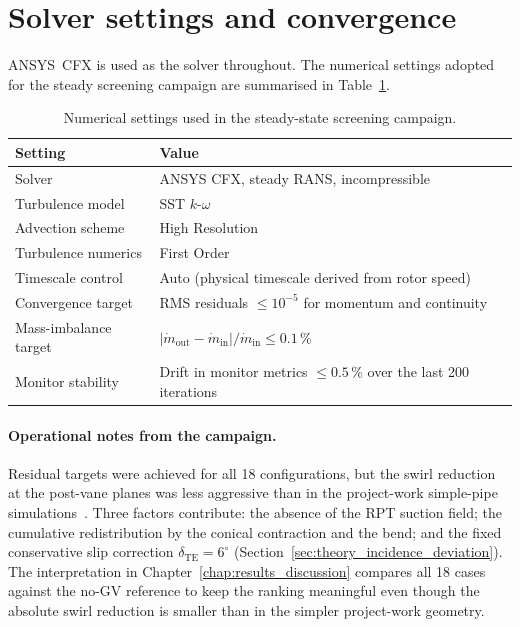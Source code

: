\section{Solver settings and convergence}
\label{sec:methods_solver}
 
ANSYS~CFX is used as the solver throughout. The numerical settings adopted for the steady screening campaign are summarised in Table~\ref{tab:cfx_settings_master}.
 
\begin{table}[h!]
  \centering
  \caption[Solver settings, screening campaign]{Numerical settings used in the steady-state screening campaign.}
  \label{tab:cfx_settings_master}
  \small
  \begin{tabular}{l l}
    \toprule
    \textbf{Setting} & \textbf{Value} \\
    \midrule
    Solver                       & ANSYS CFX, steady RANS, incompressible \\
    Turbulence model             & SST $k$-$\omega$ \\
    Advection scheme             & High Resolution \\
    Turbulence numerics          & First Order\\
    Timescale control            & Auto (physical timescale derived from rotor speed) \\
    Convergence target           & RMS residuals $\leq 10^{-5}$ for momentum and continuity \\
    Mass-imbalance target        & $|\dot m_{\mathrm{out}} - \dot m_{\mathrm{in}}|/\dot m_{\mathrm{in}} \leq 0.1\,\%$ \\
    Monitor stability            & Drift in monitor metrics $\leq 0.5\,\%$ over the last 200 iterations \\
    \bottomrule
  \end{tabular}
\end{table}
 
\paragraph{Operational notes from the campaign.}
Residual targets were achieved for all 18 configurations, but the swirl reduction at the post-vane planes was less aggressive than in the project-work simple-pipe simulations~\cite{Leonsen2025}. Three factors contribute: the absence of the RPT suction field; the cumulative redistribution by the conical contraction and the bend; and the fixed conservative slip correction $\delta_{\mathrm{TE}} = 6^\circ$ (Section~\ref{sec:theory_incidence_deviation}). The interpretation in Chapter~\ref{chap:results_discussion} compares all 18 cases against the no-GV reference to keep the ranking meaningful even though the absolute swirl reduction is smaller than in the simpler project-work geometry.
 
